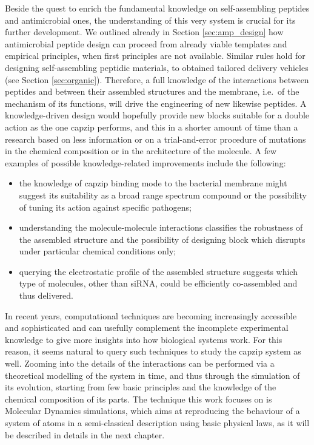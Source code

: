 Beside the quest to enrich the fundamental knowledge on self-assembling peptides and antimicrobial ones, the understanding of this very system is crucial for its further development. We outlined already in Section \ref{sec:amp_design} how antimicrobial peptide design can proceed from already viable templates and empirical principles, when first principles are not available. Similar rules hold for designing self-assembling peptidic materials, to obtained tailored delivery vehicles (see Section \ref{sec:organic}).
%
Therefore, a full knowledge of the interactions between peptides and between their assembled structures and the membrane, i.e.\ of the mechanism of its functions, will drive the engineering of new likewise peptides. A knowledge-driven design would hopefully provide new blocks suitable for a double action as the one capzip performs, and this in a shorter amount of time than a research based on less information or on a trial-and-error procedure of mutations in the chemical composition or in the architecture of the molecule. A few examples of possible knowledge-related improvements include the following:
\begin{itemize}
\item the knowledge of capzip binding mode to the bacterial membrane might suggest its suitability as a broad range spectrum compound or the possibility of tuning its action against specific pathogens;
\item understanding the molecule-molecule interactions classifies the robustness of the assembled structure and the possibility of designing block which disrupts under particular chemical conditions only;
\item querying the electrostatic profile of the assembled structure suggests which type of molecules, other than siRNA, could be efficiently co-assembled and thus delivered.
\end{itemize}

In recent years, computational techniques are becoming increasingly accessible and sophisticated and can usefully complement the incomplete experimental knowledge to give more insights into how biological systems work. For this reason, it seems natural to query such techniques to study the capzip system as well. Zooming into the details of the interactions can be performed via a theoretical modelling of the system in time, and thus through the simulation of its evolution, starting from few basic principles and the knowledge of the chemical composition of its parts. The technique this work focuses on is Molecular Dynamics simulations, which aims at reproducing the behaviour of a system of atoms in a semi-classical description using basic physical laws, as it will be described in details in the next chapter.

